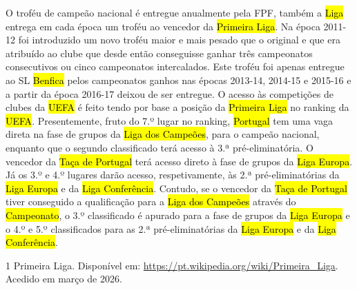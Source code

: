 \documentclass[a4paper,12pt]{article}
\begin{document}
O troféu de campeão nacional é entregue anualmente pela FPF, também a \hl{Liga} entrega em cada época um troféu ao vencedor da \hl{Primeira Liga}.
Na época 2011-12 foi introduzido um novo troféu maior e mais pesado que o original e que era atribuído ao clube que desde então conseguisse ganhar três campeonatos consecutivos ou cinco campeonatos intercalados. Este troféu foi apenas entregue ao SL \hl{Benfica} pelos campeonatos ganhos nas épocas 2013-14, 2014-15 e 2015-16 e a partir da época 2016-17 deixou de ser entregue.
O acesso às competições de clubes da \hl{UEFA} é feito tendo por base a posição da \hl{Primeira Liga} no ranking da \hl{UEFA}. Presentemente, fruto do 7.º lugar no ranking, \hl{Portugal} tem uma vaga direta na fase de grupos da \hl{Liga dos Campeões}, para o campeão nacional, enquanto que o segundo classificado terá acesso à 3.ª pré-eliminatória. O vencedor da \hl{Taça de Portugal} terá acesso direto à fase de grupos da \hl{Liga Europa}. Já os 3.º e 4.º lugares darão acesso, respetivamente, às 2.ª pré-eliminatórias da \hl{Liga Europa} e da \hl{Liga Conferência}. Contudo, se o vencedor da \hl{Taça de Portugal} tiver conseguido a qualificação para a \hl{Liga dos Campeões} através do \hl{Campeonato}, o 3.º classificado é apurado para a fase de grupos da \hl{Liga Europa} e o 4.º e 5.º classificados para as 2.ª pré-eliminatórias da \hl{Liga Europa} e da \hl{Liga Conferência}.


\begin{thebibliography}{1}
  Primeira Liga.
  Disponível em: \url{https://pt.wikipedia.org/wiki/Primeira\_Liga}.
  Acedido em março de 2026.
\end{thebibliography}
\end{document}
